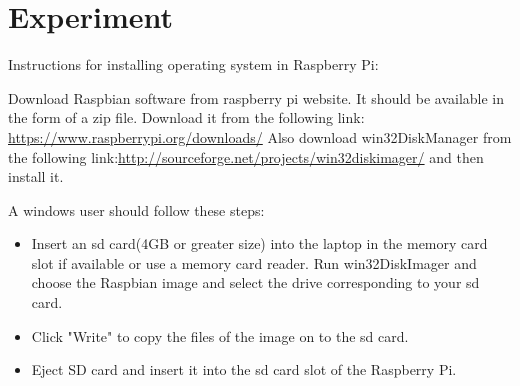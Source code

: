 \documentclass[11pt,a4paper]{report}
\begin{document}
	\newpage
	\flushleft
	\section{Experiment}
	
	Instructions for installing operating system in Raspberry Pi:
	
	Download Raspbian software from raspberry pi website. It should be available in the form of a zip file. Download it from the following link: \url{https://www.raspberrypi.org/downloads/} Also download win32DiskManager from the following link:\url{http://sourceforge.net/projects/win32diskimager/} and then install it.
	
	\vspace{0.5cm}
	A windows user should follow these steps:
	\begin{itemize}
		\item Insert an sd card(4GB or greater size) into the laptop in the memory card slot if available or use a memory card reader. Run win32DiskImager and choose the Raspbian image and select the drive corresponding to your sd card.
		\item Click "Write" to copy the files of the image on to the sd card.
		\item Eject SD card and insert it into the sd card slot of the Raspberry Pi.
	\end{itemize}
	
\end{document}
